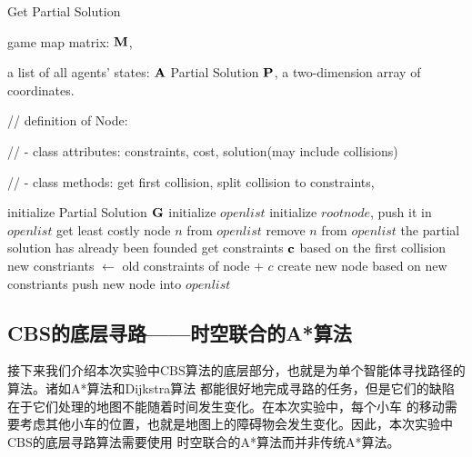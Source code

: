 \documentclass[UTF8]{ctexart}  %
\begin{document}
\begin{algorithm}[H]
    \renewcommand{\algorithmicrequire}{\textbf{Input:}}
	\renewcommand{\algorithmicensure}{\textbf{Output:}}
    \caption{Get Partial Solution}
    \label{alg:example}
    \begin{algorithmic}[2]
        \REQUIRE 
            game map matrix: $\bf M$,

            a list of all agents' states: $\bf A$
        \ENSURE
            Partial Solution $\bf P$, a two-dimension array of coordinates.

        // definition of Node: 

        // - class attributes: constraints, cost, solution(may include collisions)
        
        // - class methods: get first collision, split collision to constraints, 

        \STATE initialize Partial Solution $\bf G$  
        \STATE initialize $open list$
        \STATE initialize $root node$, push it in $open list$
            \STATE get least costly node $n$ from $open list$
            \STATE remove $n$ from $open list$
                \STATE the partial solution has already been founded
            \ELSE
                \STATE get constraints $\bf c$ based on the first collision
                    \STATE new constriants $\gets$ old constraints of node + $c$
                    \STATE create new node based on new constriants
                    \STATE push new node into $open list$
                \ENDFOR
            \ENDIF
        \ENDWHILE
    \end{algorithmic}
\end{algorithm}


\subsection{CBS的底层寻路——时空联合的A*算法}
接下来我们介绍本次实验中CBS算法的底层部分，也就是为单个智能体寻找路径的算法。诸如A*算法和Dijkstra算法
都能很好地完成寻路的任务，但是它们的缺陷在于它们处理的地图不能随着时间发生变化。在本次实验中，每个小车
的移动需要考虑其他小车的位置，也就是地图上的障碍物会发生变化。因此，本次实验中CBS的底层寻路算法需要使用
时空联合的A*算法而并非传统A*算法。
\end{document}
